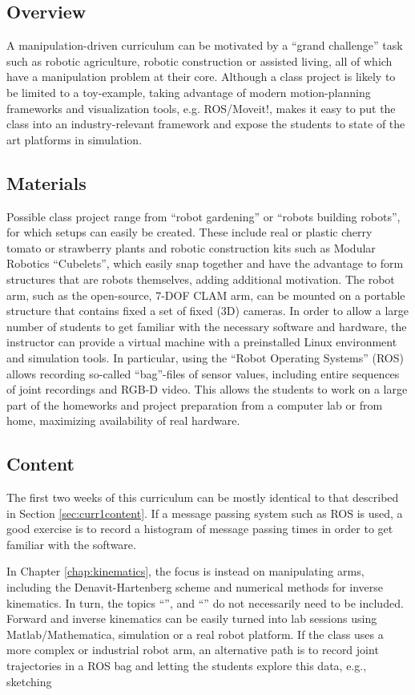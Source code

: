 \documentclass[paper=6.14in:9.21in,pagesize=pdftex,11pt,twoside,openright]{scrbook}
\begin{document}
\subsection{Overview}
A manipulation-driven curriculum can be motivated by a ``grand challenge'' task such as robotic agriculture, robotic construction or assisted living, all of which have a manipulation problem at their core. Although a class project is likely to be limited to a toy-example, taking advantage of modern motion-planning frameworks and visualization tools, e.g. ROS/Moveit!, makes it easy to put the class into an industry-relevant framework and expose the students to state of the art platforms in simulation.

\subsection{Materials}
Possible class project range from ``robot gardening'' or ``robots building robots'', for which setups can easily be created. These include real or plastic cherry tomato or strawberry plants and robotic construction kits such as Modular Robotics ``Cubelets'', which easily snap together and have the advantage to form structures that are robots themselves, adding additional motivation. The robot arm, such as the open-source, 7-DOF CLAM arm, can be mounted on a portable structure that contains fixed a set of fixed (3D) cameras. In order to allow a large number of students to get familiar with the necessary software and hardware, the instructor can provide a virtual machine with a preinstalled Linux environment and simulation tools. In particular, using the ``Robot Operating Systems'' (ROS) allows recording so-called ``bag''-files of sensor values, including entire sequences of joint recordings and RGB-D video. This allows the students to work on a large part of the homeworks and project preparation from a computer lab or from home, maximizing availability of real hardware.

\subsection{Content}
The first two weeks of this curriculum can be mostly identical to that described in Section \ref{sec:curr1content}. If a message passing system such as ROS is used, a good exercise is to record a histogram of message passing times in order to get familiar with the software.

In Chapter \ref{chap:kinematics}, the focus is instead on manipulating arms, including the Denavit-Hartenberg scheme and numerical methods for inverse kinematics. In turn, the topics ``'', and ``'' do not necessarily need to be included. Forward and inverse kinematics can be easily turned into lab sessions using Matlab/Mathematica, simulation or a real robot platform. If the class uses a more complex or industrial robot arm, an alternative path is to record joint trajectories in a ROS bag and letting the students explore this data, e.g., sketching
\end{document}
